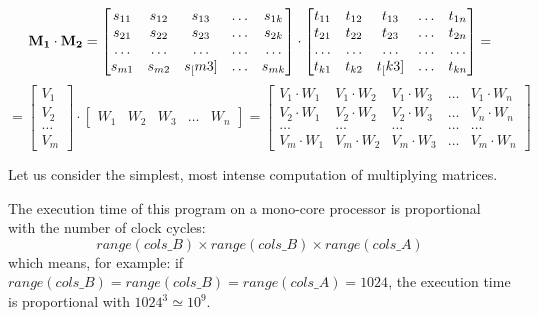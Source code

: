 \[
{\bf M_1} \cdot {\bf M_2} = 
    \begin{bmatrix}
    s_{11} & s_{12} & s_{13} & \ldots & s_{1k} \\
    s_{21} & s_{22} & s_{23} & \ldots & s_{2k} \\
    \ldots & \ldots & \ldots & \ldots & \ldots \\
    s_{m1} & s_{m2} & s_[m3] & \dots  & s_{mk}
    \end{bmatrix}
    \cdot
    \begin{bmatrix}
    t_{11} & t_{12} & t_{13} & \ldots & t_{1n} \\
    t_{21} & t_{22} & t_{23} & \ldots & t_{2n} \\
    \ldots & \ldots & \ldots & \ldots & \ldots \\
    t_{k1} & t_{k2} & t_[k3] & \dots  & t_{kn}
    \end{bmatrix}
    =
\]
\[
    =
    \begin{bmatrix}
    V_{1} \\
    V_{2} \\
    \ldots \\
    V_{m} 
    \end{bmatrix}
    \cdot
    \begin{bmatrix}
    W_{1} & W_{2} & W_{3} & \ldots & W_{n} 
    \end{bmatrix}
    =
    \begin{bmatrix}
    V_{1} \cdot W_{1} & V_{1} \cdot W_{2} & V_{1} \cdot W_{3} & \ldots & V_{1} \cdot W_{n} \\
    V_{2} \cdot W_{1} & V_{2} \cdot W_{2} & V_{2} \cdot W_{3} & \ldots & V_{n} \cdot W_{n} \\
    \ldots & \ldots & \ldots & \ldots & \ldots \\
    V_{m} \cdot W_{1} & V_{m} \cdot W_{2} & V_{m} \cdot W_{3} & \ldots & V_{m} \cdot W_{n} 
    \end{bmatrix}
\]


Let us consider the simplest, most intense computation of multiplying matrices.

The execution time of this program on a mono-core processor is proportional with the number of clock cycles:
$$range(cols\_B) \times range(cols\_B) \times range(cols\_A)$$
which means, for example: if $range(cols\_B) = range(cols\_B) = range(cols\_A) = 1024$, the execution time is proportional with $1024^3 \simeq 10^9$.


